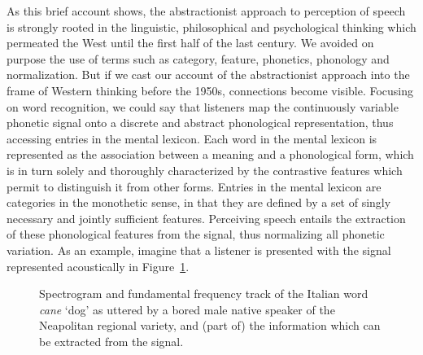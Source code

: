 As this brief account shows, the abstractionist approach to perception of speech is strongly rooted in the linguistic, philosophical and psychological thinking which permeated the West until the first half of the last century. We avoided on purpose the use of terms such as category, feature, phonetics, phonology and normalization. But if we cast our account of the abstractionist approach into the frame of Western thinking before the 1950s, connections become visible. Focusing on word recognition, we could say that listeners map the continuously variable phonetic signal onto a discrete and abstract phonological representation, thus accessing entries in the mental lexicon. Each word in the mental lexicon is represented as the association between a meaning and a phonological form, which is in turn solely and thoroughly characterized by the contrastive features which permit to distinguish it from other forms. Entries in the mental lexicon are categories in the monothetic sense, in that they are defined by a set of singly necessary and jointly sufficient features. Perceiving speech entails the extraction of these phonological features from the signal, thus normalizing all phonetic variation. As an example, imagine that a listener is presented with the signal represented acoustically in Figure~\ref{fig101}. 

\begin{figure}
\centering
{}
\caption{Spectrogram and fundamental frequency track of the Italian word \textit{cane} `dog' as uttered by a bored male native speaker of the Neapolitan regional variety, and (part of) the information which can be extracted from the signal.}
\label{fig101}\end{figure}

